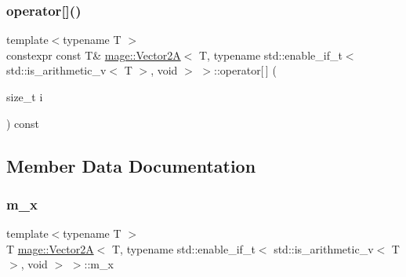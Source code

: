 \subsubsection{\texorpdfstring{operator[]()}{operator[]()}\hspace{0.1cm}{\footnotesize\ttfamily [2/2]}}
{\footnotesize\ttfamily template$<$typename T $>$ \\
constexpr const T\& \hyperlink{structmage_1_1_vector2_a}{mage\+::\+Vector2A}$<$ T, typename std\+::enable\+\_\+if\+\_\+t$<$ std\+::is\+\_\+arithmetic\+\_\+v$<$ T $>$, void $>$ $>$\+::operator\mbox{[}$\,$\mbox{]} (\begin{DoxyParamCaption}\item[{size\+\_\+t}]{i }\end{DoxyParamCaption}) const\hspace{0.3cm}{\ttfamily [noexcept]}}



\subsection{Member Data Documentation}
\hypertarget{structmage_1_1_vector2_a_3_01_t_00_01typename_01std_1_1enable__if__t_3_01std_1_1is__arithmetic__b421e7a25afc1ac5972d3b452777021a_a0e0f036dcea7ca953e4007c5b67578bf}{}\label{structmage_1_1_vector2_a_3_01_t_00_01typename_01std_1_1enable__if__t_3_01std_1_1is__arithmetic__b421e7a25afc1ac5972d3b452777021a_a0e0f036dcea7ca953e4007c5b67578bf} 
\subsubsection{\texorpdfstring{m\+\_\+x}{m\_x}}
{\footnotesize\ttfamily template$<$typename T $>$ \\
T \hyperlink{structmage_1_1_vector2_a}{mage\+::\+Vector2A}$<$ T, typename std\+::enable\+\_\+if\+\_\+t$<$ std\+::is\+\_\+arithmetic\+\_\+v$<$ T $>$, void $>$ $>$\+::m\+\_\+x}


